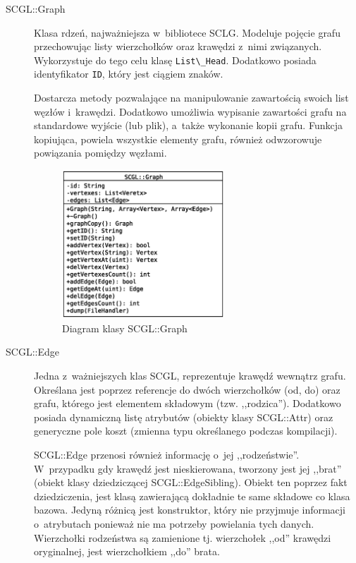 \documentclass[a4paper,12pt,polish,twoside,openright]{thesis}
\newcommand\code[1]{\lstinline[style=line]{#1}}
\begin{document}
\begin{description}
	\item[SCGL::Graph]
	Klasa rdzeń, najważniejsza w~bibliotece SCLG.
	Modeluje pojęcie grafu przechowując listy wierzchołków oraz krawędzi z~nimi związanych.
	Wykorzystuje do tego celu klasę \code{List\_Head}.
	Dodatkowo posiada identyfikator \code{ID}, który jest ciągiem znaków.

	Dostarcza metody pozwalające na manipulowanie zawartością swoich list węzłów i~krawędzi.
	Dodatkowo umożliwia wypisanie zawartości grafu na standardowe wyjście (lub plik), a~także wykonanie kopii grafu.
	Funkcja kopiująca, powiela wszystkie elementy grafu, również odwzorowuje powiązania pomiędzy węzłami.
	\begin{figure}[htb]
	\begin{center}
		\includegraphics[width=0.60\textwidth]{gfx/class_graph.eps}
		\caption{Diagram klasy SCGL::Graph}
	\end{center}
	\end{figure}

	\item[SCGL::Edge]
	Jedna z~ważniejszych klas SCGL, reprezentuje krawędź wewnątrz grafu.
	Określana jest poprzez referencje do dwóch wierzchołków (od, do) oraz grafu, którego jest elementem składowym (tzw. ,,rodzica'').
	Dodatkowo posiada dynamiczną listę atrybutów (obiekty klasy SCGL::Attr) oraz generyczne pole koszt (zmienna typu określanego podczas kompilacji).

	SCGL::Edge przenosi również informację o~jej ,,rodzeństwie''.
	W~przypadku gdy krawędź jest nieskierowana, tworzony jest jej ,,brat'' (obiekt klasy dziedziczącej SCGL::EdgeSibling).
	Obiekt ten poprzez fakt dziedziczenia, jest klasą zawierającą dokładnie te same składowe co klasa bazowa. Jedyną różnicą jest konstruktor, który nie przyjmuje informacji o~atrybutach ponieważ nie ma potrzeby powielania tych danych.
	Wierzchołki rodzeństwa są zamienione tj. wierzchołek ,,od'' krawędzi oryginalnej, jest wierzchołkiem ,,do'' brata.


\end{description}
\end{document}
